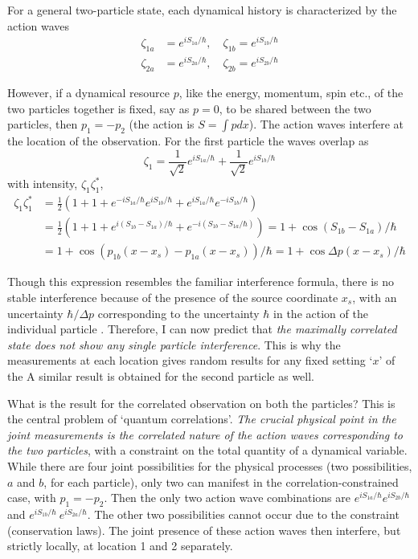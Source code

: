 For a general two-particle state, each dynamical history is characterized by the action waves
\begin{align*}
\zeta_{1a} & = e^{iS_{1a}/\hbar}, \quad \zeta_{1b}  = e^{iS_{1b}/\hbar} \nonumber\\
\zeta_{2a} & = e^{iS_{2a} /\hbar}, \quad \zeta_{2b} = e^{iS_{2b}/\hbar} \tag{33}\label{c14-eq33}
\end{align*}

However, if a dynamical resource $p$, like the energy, momentum, spin etc., of the two particles
together is fixed, say as $p = 0$, to be shared between the two particles, then $p_1 = - p_2$ (the
action is $S = \int pdx$). The action waves interfere at the location of the observation. 
For the first particle the waves overlap as
\begin{equation*}
\zeta_1 = \frac{1}{\sqrt{2}} e^{iS_{1a}/ \hbar}  + \frac{1}{\sqrt{2}} e^{iS_{1b} /\hbar} \tag{34}\label{c14-eq34}
\end{equation*}
with intensity, $\zeta_1 \zeta_1^{\ast}$,
{\fontsize{9}{9}\selectfont\begin{align*}
\zeta_1 \zeta^{\ast}_1 & = \frac{1}{2} \left(1+1+e^{-iS_{1a}/ \hbar} e^{iS_{1b} / \hbar} + e^{iS_{1a} / \hbar} e^{-iS_{1b}/\hbar} \right)\\
& = \frac{1}{2} \left( 1+1+e^{i(S_{1b} - S_{1a})/\hbar} + e^{-i(S_{1b} - S_{1a}/\hbar)} \right) = 1 + \cos (S_{1b} - S_{1a})/\hbar \tag{35}\label{c14-eq35}\\
& = 1 + \cos (p_{1b} (x-x_s) - p_{1a} (x-x_s)) / \hbar = 1 + \cos \Delta p (x-x_s) /\hbar \tag{36}\label{c14-eq36}
\end{align*}}

Though this expression resembles the familiar interference formula, there is no stable interference because of the presence of the source coordinate $x_s$, with an uncertainty $\hbar/ \Delta p$ corresponding to the uncertainty $\hbar$ in the action of the individual particle \cite{chap14-key2}. Therefore, I can
now predict that \textit{the maximally correlated state does not show any single particle interference}. This is why the measurements at each location gives random results for any fixed setting `$x$' of the A similar result is obtained for the second particle as well.

What is the result for the correlated observation on both the particles? This is the
central problem of `quantum correlations'. \textit{The crucial physical point in the joint measurements is the correlated nature of the action waves corresponding to the two particles}, with a constraint on the total quantity of a dynamical variable. While there are four joint possibilities for the physical processes (two possibilities, $a$ and $b$, for each particle), only two can manifest in the correlation-constrained case, with $p_1 = -p_2$. Then the only two action wave combinations
are $e^{iS_{1a} /\hbar}  e^{iS_{2b} /\hbar}$ and $e^{iS_{1b}/ \hbar} ~e^{iS_{2a}/\hbar}$. The other two possibilities cannot occur due to the
constraint (conservation laws). The joint presence of these action waves then interfere, but strictly locally, at location 1 and 2 separately.


